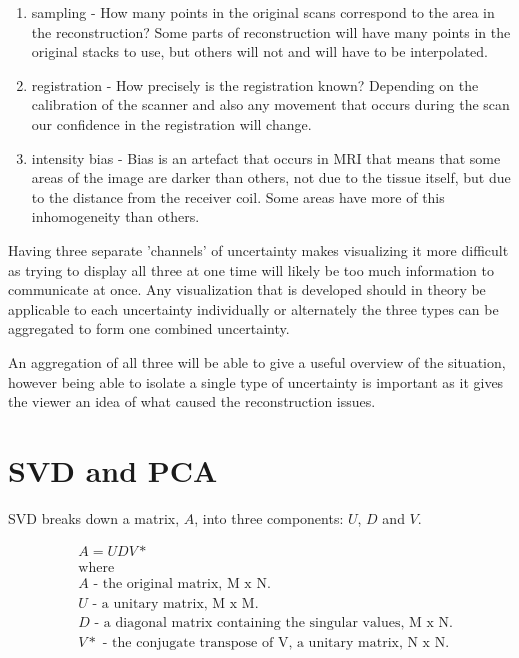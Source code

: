 \begin{enumerate}
	\item sampling - How many points in the original scans correspond to the area in the reconstruction? Some parts of reconstruction will have many points in the original stacks to use, but others will not and will have to be interpolated.
	\item registration - How precisely is the registration known? Depending on the calibration of the scanner and also any movement that occurs during the scan our confidence in the registration will change.
	\item intensity bias - Bias is an artefact that occurs in MRI that means that some areas of the image are darker than others, not due to the tissue itself, but due to the distance from the receiver coil. Some areas have more of this inhomogeneity than others.
\end{enumerate}

Having three separate 'channels' of uncertainty makes visualizing it more difficult as trying to display all three at one time will likely be too much information to communicate at once. Any visualization that is developed should in theory be applicable to each uncertainty individually or alternately the three types can be aggregated to form one combined uncertainty.

An aggregation of all three will be able to give a useful overview of the situation, however being able to isolate a single type of uncertainty is important as it gives the viewer an idea of what caused the reconstruction issues.

\newpage
\section{SVD and PCA}\label{background:svdpca}
SVD breaks down a matrix, $A$, into three components: $U$, $D$ and $V$.

\begin{align}
& A = UDV* \nonumber \\
& \text{where} \nonumber \\
& A \text{ - the original matrix, M x N.} \nonumber \\
& U \text{ - a unitary matrix, M x M.} \nonumber \\
& D \text{ - a diagonal matrix containing the singular values, M x N.} \nonumber \\
& V* \text{ - the conjugate transpose of V, a unitary matrix, N x N.} \nonumber
\end{align}

